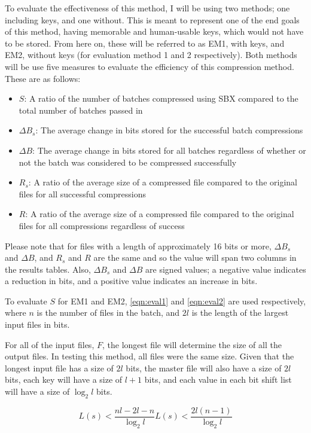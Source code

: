 \documentclass[10pt]{article}
\begin{document}
To evaluate the effectiveness of this method, I will be using two methods; one including keys, and one without. This is meant to represent one of the end goals of this method, having memorable and human-usable keys, which would not have to be stored. From here on, these will be referred to as EM1, with keys, and EM2, without keys (for evaluation method 1 and 2 respectively). Both methods will be use five measures to evaluate the efficiency of this compression method. These are as follows:
\begin{itemize}
    \item $S$: A ratio of the number of batches compressed using SBX compared to the total number of batches passed in
    \item $\Delta B_s$: The average change in bits stored for the successful batch compressions
    \item $\Delta B$: The average change in bits stored for all batches regardless of whether or not the batch was considered to be compressed successfully
    \item $R_s$: A ratio of the average size of a compressed file compared to the original files for all successful compressions
    \item $R$: A ratio of the average size of a compressed file compared to the original files for all compressions regardless of success
\end{itemize}

Please note that for files with a length of approximately 16 bits or more, $\Delta B_s$ and $\Delta B$, and $R_s$ and $R$ are the same and so the value will span two columns in the results tables. Also, $\Delta B_s$ and $\Delta B$ are signed values; a negative value indicates a reduction in bits, and a positive value indicates an increase in bits.

To evaluate $S$ for EM1 and EM2, \cref{eqn:eval1} and \cref{eqn:eval2} are used respectively, where $n$ is the number of files in the batch, and $2l$ is the length of the largest input files in bits.

For all of the input files, $F$, the longest file will determine the size of all the output files. In testing this method, all files were the same size. Given that the longest input file has a size of $2l$ bits, the master file will also have a size of $2l$ bits, each key will have a size of $l + 1$ bits, and each value in each bit shift list will have a size of $\log_2l$ bits.

\begin{subequations}\label{eqn:evalMethods}
\begin{equation}\label{eqn:eval1}
    L(s) < \frac{nl-2l-n}{\log_2l}
\end{equation}
\begin{equation}\label{eqn:eval2}
    L(s) < \frac{2l(n-1)}{\log_2l}
\end{equation}
\end{subequations}
\end{document}
